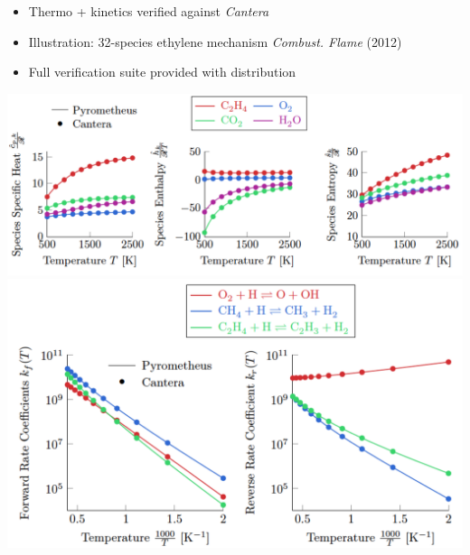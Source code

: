 \begin{frame}\frametitle{\pyrometheus{}~~~~~~~~~~~~~~~~~~~~~~~~~~~}
\begin{itemize}
  \item Thermo + kinetics verified against \textit{Cantera}
  \item Illustration: 32-species ethylene mechanism \tiny{ \textit{Combust. Flame} (2012)}\normalsize
  \item Full verification suite provided with distribution
\end{itemize}
  \begin{center}
  \includegraphics[width=.7\textwidth]{figures/PyroVerif1.png}\\
  \includegraphics[width=.5\textwidth]{figures/PyroVerif2.png}
  \end{center}
\end{frame}

